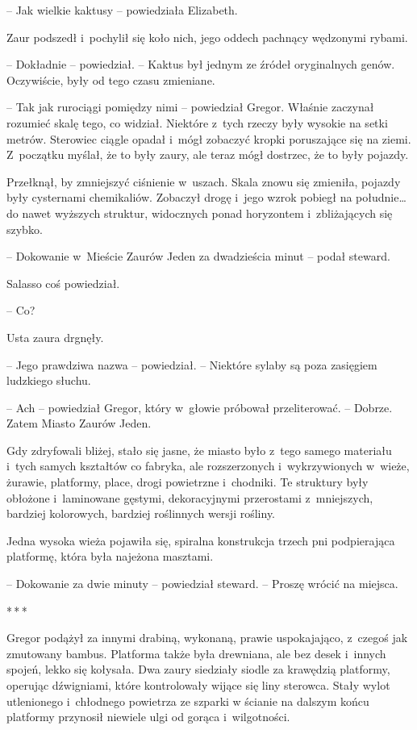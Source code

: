 \documentclass[oneside,polish,12pt,sfheadings]{mwbk}
\newcommand{\threeast}{\bigskip\par\centerline{*\,*\,*}\medskip\par}%
\begin{document}
-- Jak wielkie kaktusy -- powiedziała Elizabeth.

Zaur podszedł i~pochylił się koło nich, jego oddech pachnący wędzonymi
rybami.

-- Dokładnie -- powiedział. -- Kaktus był jednym ze źródeł oryginalnych
genów. Oczywiście, były od tego czasu zmieniane.

-- Tak jak rurociągi pomiędzy nimi -- powiedział Gregor. Właśnie zaczynał
rozumieć skalę tego, co widział. Niektóre z~tych rzeczy były wysokie na
setki metrów. Sterowiec ciągle opadał i~mógł zobaczyć kropki poruszające
się na ziemi. Z~początku myślał, że to były zaury, ale teraz mógł
dostrzec, że to były pojazdy.

Przełknął, by zmniejszyć ciśnienie w~uszach. Skala znowu się zmieniła,
pojazdy były cysternami chemikaliów. Zobaczył drogę i~jego wzrok pobiegł
na południe\ldots do nawet wyższych struktur, widocznych ponad horyzontem i~zbliżających się szybko.

-- Dokowanie w~Mieście Zaurów Jeden za dwadzieścia minut -- podał steward.

Salasso coś powiedział.

-- Co?

Usta zaura drgnęły. 

-- Jego prawdziwa nazwa -- powiedział. -- Niektóre
sylaby są poza zasięgiem ludzkiego słuchu.

-- Ach -- powiedział Gregor, który w~głowie próbował przeliterować. --
Dobrze. Zatem Miasto Zaurów Jeden.

Gdy zdryfowali bliżej, stało się jasne, że miasto było z~tego samego
materiału i~tych samych kształtów co fabryka, ale rozszerzonych i~wykrzywionych w~wieże, żurawie, platformy, place, drogi powietrzne i~chodniki. Te struktury były obłożone i~laminowane gęstymi, dekoracyjnymi
przerostami z~mniejszych, bardziej kolorowych, bardziej roślinnych
wersji rośliny.

Jedna wysoka wieża pojawiła się, spiralna konstrukcja trzech pni
podpierająca platformę, która była najeżona masztami.

-- Dokowanie za dwie minuty -- powiedział steward. -- Proszę wrócić na
miejsca.

\threeast

Gregor podążył za innymi drabiną, wykonaną, prawie uspokajająco, z~czegoś jak zmutowany bambus. Platforma także była drewniana, ale bez
desek i~innych spojeń, lekko się kołysała. Dwa zaury siedziały siodle za
krawędzią platformy, operując dźwigniami, które kontrolowały wijące się
liny sterowca. Stały wylot utlenionego i~chłodnego powietrza ze szparki
w ścianie na dalszym końcu platformy przynosił niewiele ulgi od gorąca i~wilgotności.
\end{document}
